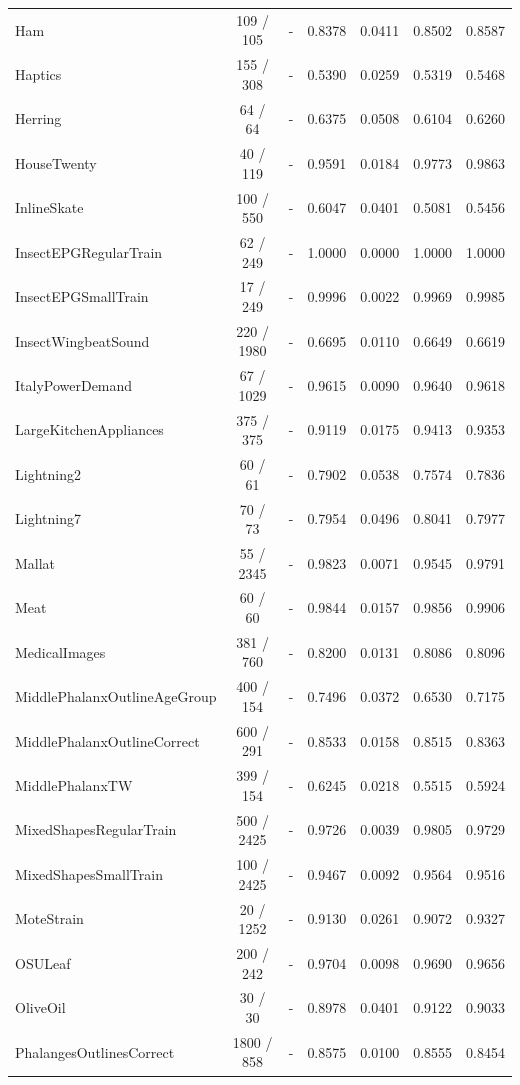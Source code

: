 \begin{longtable}{lcccccc}
Ham & 109 / 105 & - & 0.8378 & 0.0411 & 0.8502 & 0.8587 \\
Haptics & 155 / 308 & - & 0.5390 & 0.0259 & 0.5319 & 0.5468 \\
Herring & 64 / 64 & - & 0.6375 & 0.0508 & 0.6104 & 0.6260 \\
HouseTwenty & 40 / 119 & - & 0.9591 & 0.0184 & 0.9773 & 0.9863 \\
InlineSkate & 100 / 550 & - & 0.6047 & 0.0401 & 0.5081 & 0.5456 \\
InsectEPGRegularTrain & 62 / 249 & - & 1.0000 & 0.0000 & 1.0000 & 1.0000 \\
InsectEPGSmallTrain & 17 / 249 & - & 0.9996 & 0.0022 & 0.9969 & 0.9985 \\
InsectWingbeatSound & 220 / 1980 & - & 0.6695 & 0.0110 & 0.6649 & 0.6619 \\
ItalyPowerDemand & 67 / 1029 & - & 0.9615 & 0.0090 & 0.9640 & 0.9618 \\
LargeKitchenAppliances & 375 / 375 & - & 0.9119 & 0.0175 & 0.9413 & 0.9353 \\
Lightning2 & 60 / 61 & - & 0.7902 & 0.0538 & 0.7574 & 0.7836 \\
Lightning7 & 70 / 73 & - & 0.7954 & 0.0496 & 0.8041 & 0.7977 \\
Mallat & 55 / 2345 & - & 0.9823 & 0.0071 & 0.9545 & 0.9791 \\
Meat & 60 / 60 & - & 0.9844 & 0.0157 & 0.9856 & 0.9906 \\
MedicalImages & 381 / 760 & - & 0.8200 & 0.0131 & 0.8086 & 0.8096 \\
MiddlePhalanxOutlineAgeGroup & 400 / 154 & - & 0.7496 & 0.0372 & 0.6530 & 0.7175 \\
MiddlePhalanxOutlineCorrect & 600 / 291 & - & 0.8533 & 0.0158 & 0.8515 & 0.8363 \\
MiddlePhalanxTW & 399 / 154 & - & 0.6245 & 0.0218 & 0.5515 & 0.5924 \\
MixedShapesRegularTrain & 500 / 2425 & - & 0.9726 & 0.0039 & 0.9805 & 0.9729 \\
MixedShapesSmallTrain & 100 / 2425 & - & 0.9467 & 0.0092 & 0.9564 & 0.9516 \\
MoteStrain & 20 / 1252 & - & 0.9130 & 0.0261 & 0.9072 & 0.9327 \\
OSULeaf & 200 / 242 & - & 0.9704 & 0.0098 & 0.9690 & 0.9656 \\
OliveOil & 30 / 30 & - & 0.8978 & 0.0401 & 0.9122 & 0.9033 \\
PhalangesOutlinesCorrect & 1800 / 858 & - & 0.8575 & 0.0100 & 0.8555 & 0.8454 \\

\end{longtable}
